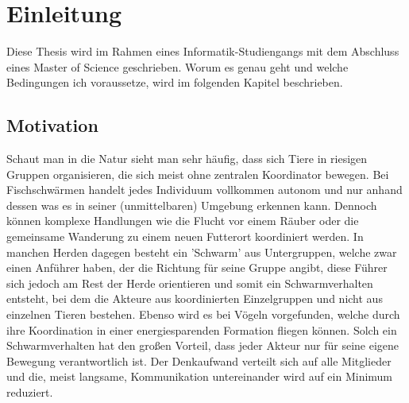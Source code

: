 \chapter{Einleitung}\label{ch:Einleitung}
Diese Thesis wird im Rahmen eines Informatik-Studiengangs mit dem Abschluss eines Master of Science geschrieben. Worum es genau geht und welche Bedingungen ich voraussetze, wird im folgenden Kapitel beschrieben.

\section{Motivation}\label{sec:Motivation}
Schaut man in die Natur sieht man sehr häufig, dass sich Tiere in riesigen Gruppen organisieren, die sich meist ohne zentralen Koordinator bewegen.
Bei Fischschwärmen handelt jedes Individuum vollkommen autonom und nur anhand dessen was es in seiner (unmittelbaren) Umgebung erkennen kann. Dennoch können komplexe Handlungen wie die Flucht vor einem Räuber oder die gemeinsame Wanderung zu einem neuen Futterort koordiniert werden.
In manchen Herden dagegen besteht ein 'Schwarm' aus Untergruppen, welche zwar einen Anführer haben, der die Richtung für seine Gruppe angibt, diese Führer sich jedoch am Rest der Herde orientieren und somit ein Schwarmverhalten entsteht, bei dem die Akteure aus koordinierten Einzelgruppen und nicht aus einzelnen Tieren bestehen.
Ebenso wird es bei Vögeln vorgefunden, welche durch ihre Koordination in einer energiesparenden Formation fliegen können.
Solch ein Schwarmverhalten hat den großen Vorteil, dass jeder Akteur nur für seine eigene Bewegung verantwortlich ist. Der Denkaufwand verteilt sich auf alle Mitglieder und die, meist langsame, Kommunikation untereinander wird auf ein Minimum reduziert.

